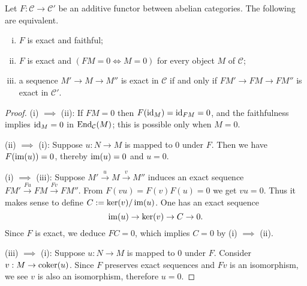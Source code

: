 \begin{lemma}\label{prop:faithful-functor} 
	Let $F: \mathcal{C} \to \mathcal{C}'$ be an additive functor between abelian categories. The following are equivalent.
	\begin{enumerate}[(i)]
		\item $F$ is exact and faithful;
		\item $F$ is exact and $(FM=0 \iff M=0)$ for every object $M$ of $\mathcal{C}$;
		\item a sequence $M' \to M \to M''$ is exact in $\mathcal{C}$ if and only if $FM' \to FM \to FM''$ is exact in $\mathcal{C}'$.
	\end{enumerate}
\end{lemma}
\begin{proof}
	(i) $\implies$ (ii): If $FM=0$ then $F(\mathrm{id}_M)=\mathrm{id}_{FM}=0$, and the faithfulness implies $\mathrm{id}_M=0$ in $\operatorname{End}_{\mathcal{C}}(M)$; this is possible only when $M=0$.

	(ii) $\implies$ (i): Suppose $u: N \to M$ is mapped to $0$ under $F$. Then we have $F(\operatorname{im}(u))=0$, thereby $\operatorname{im}(u)=0$ and $u=0$.

	(i) $\implies$ (iii): Suppose $M' \xrightarrow{u} M \xrightarrow{v} M''$ induces an exact sequence $FM' \xrightarrow{Fu} FM \xrightarrow{Fv} FM''$. From $F(vu) = F(v)F(u) = 0$ we get $vu=0$. Thus it makes sense to define $C := \operatorname{ker}(v)/\operatorname{im}(u)$. One has an exact sequence
	\[ \operatorname{im}(u) \to \operatorname{ker}(v) \to C \to 0. \]
	Since $F$ is exact, we deduce $FC=0$, which implies $C=0$ by (i) $\implies$ (ii).

	(iii) $\implies$ (i): Suppose $u: N \to M$ is mapped to $0$ under $F$. Consider $v: M \to \operatorname{coker}(u)$. Since $F$ preserves exact sequences and $Fv$ is an isomorphism, we see $v$ is also an isomorphism, therefore $u=0$.
\end{proof}

